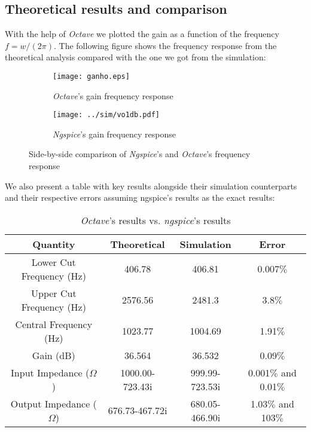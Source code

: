 \subsection{Theoretical results and comparison}

With the help of \textit{Octave} we plotted the gain as a function of the frequency $f=w/(2\pi)$. The following figure shows the frequency response from the theoretical analysis compared with the one we got from the simulation:
\begin{figure}[H]
\centering
\begin{subfigure}{.5\textwidth}
  \centering
  \texttt{[image: ganho.eps]}
  \caption{\textit{Octave}'s gain frequency response}
  \label{fig:Ngspicegain(f)}
\end{subfigure}%
\begin{subfigure}{.5\textwidth}
  \centering
  \texttt{[image: ../sim/vo1db.pdf]}
  \caption{\textit{Ngspice}'s gain frequency response}
  \label{fig:Ngspicegain(f)}
\end{subfigure}
\caption{Side-by-side comparison of \textit{Ngspice}'s and \textit{Octave}'s frequency response}
\label{fig:Gaincomparison}
\end{figure}

We also present a table with key results alongside their simulation counterparts and their respective errors assuming ngspice's results as the exact results:

\begin{center}
    \begin{table}[H]
        \centering
        \begin{tabular}{c|c|c|c}
          \textbf{Quantity} & \textbf{Theoretical}  & \textbf{Simulation} & \textbf{Error}\\
          \hline

            Lower Cut Frequency (Hz) &  406.78 &  406.81 & 0.007$\%$ \\
            Upper Cut Frequency (Hz)&  2576.56 &  2481.3 & 3.8$\%$ \\
            Central Frequency (Hz)& 1023.77 &  1004.69 & 1.91$\%$  \\
            Gain (dB) &  36.564  & 36.532 & 0.09$\%$ \\
            Input Impedance ($\Omega$) & 1000.00-723.43i & 999.99-723.53i & 0.001$\%$ and 0.01$\%$\\
            Output Impedance ($\Omega$) & 676.73-467.72i & 680.05-466.90i & 1.03$\%$ and 103$\%$\\
        \end{tabular}
        \caption{\textit{Octave}'s results vs. \textit{ngspice}'s results}
    \end{table}
\end{center}
